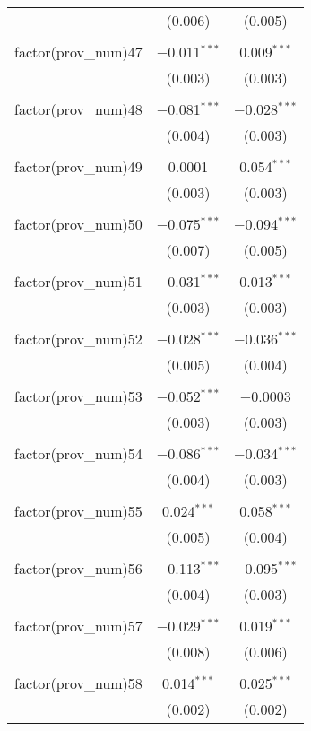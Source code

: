 \begin{table}[!htbp]
\begin{tabular}{@{\extracolsep{5pt}}lcc}
  & (0.006) & (0.005) \\ 
  & & \\ 
 factor(prov\_num)47 & $-$0.011$^{***}$ & 0.009$^{***}$ \\ 
  & (0.003) & (0.003) \\ 
  & & \\ 
 factor(prov\_num)48 & $-$0.081$^{***}$ & $-$0.028$^{***}$ \\ 
  & (0.004) & (0.003) \\ 
  & & \\ 
 factor(prov\_num)49 & 0.0001 & 0.054$^{***}$ \\ 
  & (0.003) & (0.003) \\ 
  & & \\ 
 factor(prov\_num)50 & $-$0.075$^{***}$ & $-$0.094$^{***}$ \\ 
  & (0.007) & (0.005) \\ 
  & & \\ 
 factor(prov\_num)51 & $-$0.031$^{***}$ & 0.013$^{***}$ \\ 
  & (0.003) & (0.003) \\ 
  & & \\ 
 factor(prov\_num)52 & $-$0.028$^{***}$ & $-$0.036$^{***}$ \\ 
  & (0.005) & (0.004) \\ 
  & & \\ 
 factor(prov\_num)53 & $-$0.052$^{***}$ & $-$0.0003 \\ 
  & (0.003) & (0.003) \\ 
  & & \\ 
 factor(prov\_num)54 & $-$0.086$^{***}$ & $-$0.034$^{***}$ \\ 
  & (0.004) & (0.003) \\ 
  & & \\ 
 factor(prov\_num)55 & 0.024$^{***}$ & 0.058$^{***}$ \\ 
  & (0.005) & (0.004) \\ 
  & & \\ 
 factor(prov\_num)56 & $-$0.113$^{***}$ & $-$0.095$^{***}$ \\ 
  & (0.004) & (0.003) \\ 
  & & \\ 
 factor(prov\_num)57 & $-$0.029$^{***}$ & 0.019$^{***}$ \\ 
  & (0.008) & (0.006) \\ 
  & & \\ 
 factor(prov\_num)58 & 0.014$^{***}$ & 0.025$^{***}$ \\ 
  & (0.002) & (0.002) \\ 

\end{tabular}
\end{table}
